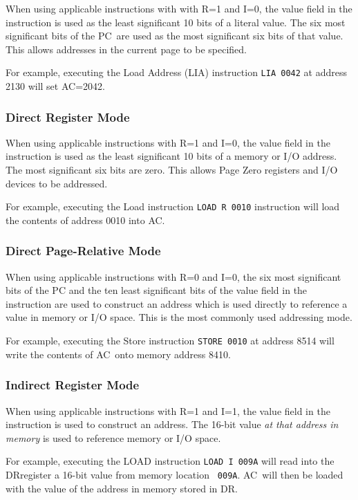 \documentclass[11pt,a4paper,twocolumns]{article}
\newcommand\hex[1]{\textsf{#1}}
\newcommand\register[1]{\textsf{#1}}
\newcommand\A{\register{AC}}
\newcommand\DR{\register{DR}}
\newcommand\PC{\register{PC}}
\begin{document}
When using applicable instructions with with R=1 and I=0, the value
field in the instruction is used as the least significant 10 bits of a
literal value. The six most significant bits of the \PC\ are used as the
most significant six bits of that value. This allows addresses in the
current page to be specified.

For example, executing the Load Address (LIA) instruction {\tt LIA
  0042} at address \hex{2130} will set \A=\hex{2042}.

\subsubsection{Direct Register Mode}

When using applicable instructions with R=1 and I=0, the value field
in the instruction is used as the least significant 10 bits of a
memory or I/O address. The most significant six bits are zero. This
allows Page Zero registers and I/O devices to be addressed.

For example, executing the Load instruction {\tt LOAD R 0010}
instruction will load the contents of address \hex{0010} into \A.

\subsubsection{Direct Page-Relative Mode}

When using applicable instructions with R=0 and I=0, the six most
significant bits of the \PC{} and the ten least significant bits of
the value field in the instruction are used to construct an address
which is used directly to reference a value in memory or I/O
space. This is the most commonly used addressing mode.

For example, executing the Store instruction {\tt STORE 0010} at
address \hex{8514} will write the contents of \A\  onto memory address
\hex{8410}.

\subsubsection{Indirect Register Mode}

When using applicable instructions with R=1 and I=1, the value field
in the instruction is used to construct an address. The 16-bit value
{\em at that address in memory\/} is used to reference memory or I/O
space.

For example, executing the LOAD instruction {\tt LOAD I 009A} will
read into the \DR register a 16-bit value from memory location {\tt
  009A}. \A\  will then be loaded with the value of the address in
memory stored in \DR.
\end{document}

